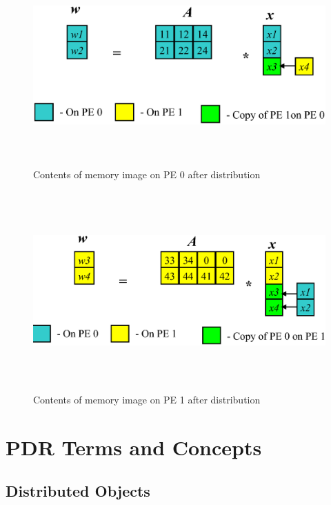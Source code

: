 \documentclass[10pt,relax]{PetraObjectModel}
\begin{document}
\begin{figure}
\begin{center}
\includegraphics[height=3in]{PE0SpMV}
\end{center}
\label{PE0MatrixVectorDistribution}
\caption{Contents of memory image on PE 0 after distribution}
\end{figure}

\begin{figure}
\begin{center}
\includegraphics[height=3in]{PE1SpMV}
\end{center}
\label{PE1MatrixVectorDistribution}
\caption{Contents of memory image on PE 1 after distribution}
\end{figure}


\section{PDR Terms and Concepts}
\label{sect:concepts}

\subsection{Distributed Objects}
\end{document}
